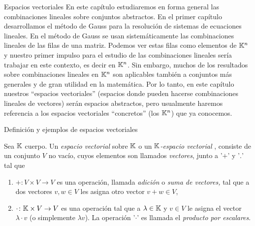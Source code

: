 


    \begin{chapter}{Espacios vectoriales}\label{chap-esp-vect} En este capítulo estudiaremos en forma general las combinaciones lineales sobre conjuntos abstractos. En el primer capítulo desarrollamos el método de Gauss para la resolución de sistemas de ecuaciones lineales. En el método de Gauss se usan sistemáticamente las combinaciones lineales de las filas de una matriz. Podemos ver estas filas como elementos de $\mathbb K^n$  y nuestro primer impulso para el estudio de las combinaciones lineales sería trabajar en este contexto, es decir  en $\mathbb K^n$.  Sin embargo, muchos de los resultados sobre combinaciones lineales en $\mathbb K^n$ son aplicables también a conjuntos más generales y de gran utilidad en la matemática. Por lo tanto, en este capítulo nuestros ``espacios vectoriales'' (espacios donde pueden hacerse combinaciones lineales de vectores) serán espacios abstractos, pero usualmente haremos referencia a los espacios vectoriales ``concretos'' (los $\mathbb K^n$) que ya conocemos. 
        
        
        \begin{section}{Definici\'on y ejemplos de espacios vectoriales}\label{seccion-definicion-de-espacios-vectoriales}
            
            \begin{definicion}\label{def-esp-vect} Sea $\mathbb K$ cuerpo. Un \textit{espacio vectorial} sobre $\mathbb K$ o un \textit{$\mathbb K$-espacio vectorial }, consiste de  un  conjunto $V$ no vacío, cuyos elementos son llamados \textit{vectores}, junto a  '$+$' y '$.$' tal que
                \begin{enumerate}[label=\textit{\alph*)}, ref=\textit{\alph*)}]
                    \item $+\colon V\times V\to V$ es una operación, llamada \textit{adición} o  \textit{suma de vectores,} tal que a dos vectores $v,w \in V$ les asigna otro vector $v+w \in V$,
                    \item  $\cdot \colon \mathbb K\times V\to V$ es una operación tal que a $\lambda \in \mathbb K$ y $v \in V$ le asigna el vector $\lambda\cdot v$ (o simplemente $\lambda v$).  La operación '$\cdot$' es llamada  el \textit{producto por escalares}.
                     

\end{enumerate}
\end{definicion}
\end{section}
\end{chapter}
